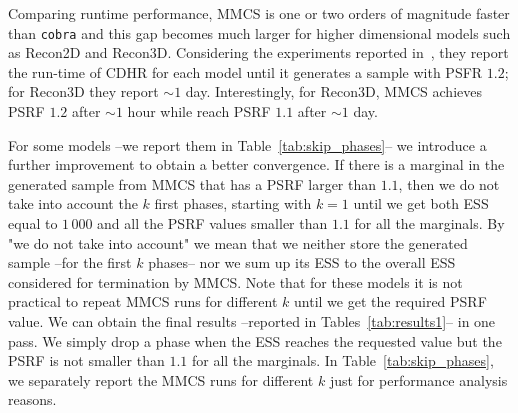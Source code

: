    Comparing runtime performance,  MMCS is one or two orders of magnitude faster than \texttt{cobra} and this gap becomes much larger for higher dimensional models such as Recon2D and Recon3D. 
   Considering the experiments reported in~\citep{jadebeck2020hops}, they report the run-time of CDHR for each model until it generates a sample with PSFR $1.2$; for Recon3D they report $\sim 1$ day. 
   Interestingly, for Recon3D, MMCS achieves PSRF $1.2$ after $\sim 1$ hour while reach PSRF $1.1$ after $\sim 1$ day. 

   For some models --we report them in Table~\ref{tab:skip_phases}-- we introduce a further improvement to obtain a better convergence. If there is a marginal in
   the generated sample from MMCS that has a PSRF larger than $1.1$, then we do not take into account the $k$ first phases, starting with $k=1$ until we get
   both ESS equal to $1\, 000$ and all the PSRF values smaller than $1.1$ for all the marginals. By "we do not take into account" we mean that  we neither store the generated sample --for the first $k$ phases-- nor we sum up its ESS to the
   overall ESS considered for termination by MMCS. Note that for these models it is not practical to repeat MMCS runs for different $k$ until we get the required PSRF value. We can obtain the final results --reported in
   Tables~\ref{tab:results1}-- in one pass. We simply drop a phase when the ESS
   reaches the requested value but the PSRF is not smaller than $1.1$ for all the
   marginals. In Table~\ref{tab:skip_phases}, we separately report the MMCS runs for different $k$ just for performance analysis reasons.


